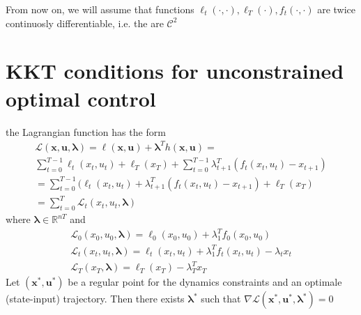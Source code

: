 \documentclass{book}
\newcommand{\R}{\mathbb{R}}
\theoremstyle{definition}
\theoremstyle{remark}
\theoremstyle{remark}
\begin{document}
From now on, we will assume that functions $\ell_t(\cdot,\cdot),\ell_T(\cdot),f_t(\cdot,\cdot)$ are twice continuosly differentiable, i.e. the are $\mathcal{C}^2$
%
\section{KKT conditions for unconstrained optimal control}
the Lagrangian function has the form 
\begin{multline*}
    \mathcal{L}(\mathbf{x,u,\lambda}) = \ell(\mathbf{x,u})+\mathbf{\lambda}^Th(\mathbf{x,u}) = \\
    \displaystyle\sum_{t=0}^{T-1}\ell_t(x_t,u_t)+\ell_T(x_T) + \displaystyle\sum_{t=0}^{T-1}\lambda^T_{t+1}(f_t(x_t,u_t)-x_{t+1}) \\
    = \displaystyle\sum_{t=0}^{T-1}(\ell_t(x_t,u_t)+\lambda^T_{t+1}(f_t(x_t,u_t)-x_{t+1})+\ell_T(x_T) \\
    =\displaystyle\sum_{t=0}^{T}\mathcal{L}_t(x_t,u_t,\mathbf{\lambda})
\end{multline*}
where $\mathbf{\lambda}\in\R^{nT}$ and 
\begin{gather*}
    \mathcal{L}_0(x_0,u_0,\mathbf{\lambda}) = \ell_0(x_0,u_0)+\lambda_1^T f_0(x_0,u_0)\\
    \mathcal{L}_t(x_t,u_t,\mathbf{\lambda}) = \ell_t(x_t,u_t)+\lambda_1^T f_t(x_t,u_t)-\lambda_tx_t\\
    \mathcal{L}_T(x_T,\mathbf{\lambda}) = \ell_T(x_T) - \lambda_T^Tx_T
\end{gather*}
Let $(\mathbf{x}^*,\mathbf{u}^*)$ be a regular point for the dynamics constraints and an optimale (state-input) trajectory. Then there exists $\mathbf{\lambda}^*$ such that $\nabla \mathcal{L}(\mathbf{x}^*,\mathbf{u}^*,\mathbf{\lambda}^*)=0$ 
\end{document}
